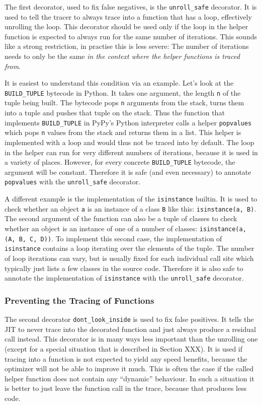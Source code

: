 \documentclass{sig-alternate}
\begin{document}
The first decorator, used to fix false negatives, is the \texttt{unroll\_safe}
decorator. It is used to tell the tracer to always trace into a function that
has a loop, effectively unrolling the loop. This decorator should be used only
if the loop in the helper function is expected to always run for the same number
of iterations. This sounds like a strong restriction, in practise this is less
severe: The number of iterations needs to only be the same \emph{in the context where
the helper functions is traced from}.

It is easiest to understand this condition via an example. Let's look at the
\texttt{BUILD\_TUPLE} bytecode in Python. It takes one argument, the length \texttt{n} of
the tuple being built. The bytecode pops \texttt{n} arguments from the stack, turns
them into a tuple and pushes that tuple on the stack. Thus the function that
implements \texttt{BUILD\_TUPLE} in PyPy's Python interpreter calls a helper
\texttt{popvalues} which pops \texttt{n} values from the stack and returns them in a list.
This helper is implemented with a loop and would thus not be traced into by
default.  The loop in the helper can run for very different numbers of
iterations, because it is used in a variety of places. However, for every
concrete \texttt{BUILD\_TUPLE} bytecode, the argument will be constant. Therefore it
is safe (and even necessary) to annotate \texttt{popvalues} with the \texttt{unroll\_safe}
decorator.

A different example is the implementation of the \texttt{isinstance} builtin. It is
used to check whether an object \texttt{a} is an instance of a class \texttt{B} like
this: \texttt{isinstance(a, B)}. The second argument of the function can also be a
tuple of classes to check whether an object is an instance of one of a number of
classes: \texttt{isinstance(a, (A, B, C, D))}. To implement this second case, the
implementation of \texttt{isinstance} contains a loop iterating over the elements of
the tuple. The number of loop iterations can vary, but is usually fixed for each
individual call site which typically just lists a few classes in the source
code. Therefore it is also safe to annotate the implementation of \texttt{isinstance}
with the \texttt{unroll\_safe} decorator.


\subsubsection{Preventing the Tracing of Functions}

The second decorator \texttt{dont\_look\_inside} is used to fix false positives. It
tells the JIT to never trace into the decorated function and just always produce
a residual call instead. This decorator is in many ways less important than the
unrolling one (except for a special situation that is described in
Section XXX). It is used if tracing into a function is not expected to yield
any speed benefits, because the optimizer will not be able to improve it much.
This is often the case if the called helper function does not contain any
``dynamic'' behaviour. In such a situation it is better to just leave the function
call in the trace, because that produces less code.
\end{document}
